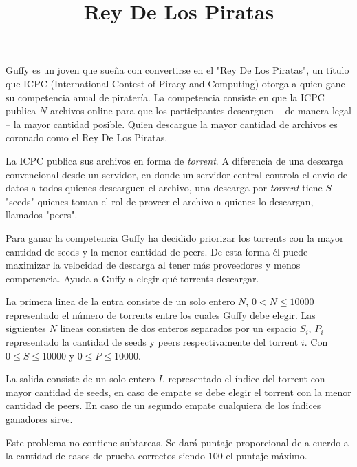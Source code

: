 \documentclass{oci}
\title{Rey De Los Piratas}
\begin{document}
\begin{problemDescription}
    Guffy es un joven que sueña con convertirse en el "Rey De Los Piratas", un título que ICPC (International
    Contest of Piracy and Computing) otorga a quien gane su competencia anual de piratería. La competencia
    consiste en que la ICPC publica $N$ archivos online para que los participantes descarguen -- de
    manera legal -- la mayor cantidad posible. Quien descargue la mayor cantidad de archivos es coronado como
    el Rey De Los Piratas.

    La ICPC publica sus archivos en forma de \emph{torrent}. A diferencia de una descarga convencional desde
    un servidor, en donde un servidor central controla el envío de datos a todos quienes descarguen el
    archivo, una descarga por \emph{torrent} tiene $S$ "seeds" quienes toman el rol de proveer el archivo
    a quienes lo descargan, llamados "peers".

    Para ganar la competencia Guffy ha decidido priorizar los torrents con la mayor cantidad de seeds y la menor
    cantidad de peers. De esta forma él puede maximizar la velocidad de descarga al tener más proveedores y menos
    competencia. Ayuda a Guffy a elegir qué torrents descargar.
\end{problemDescription}

\begin{inputDescription}
La primera linea de la entra consiste de un solo entero $N$, $0 < N \leq 10000$ representado el número de torrents
entre los cuales Guffy debe elegir. Las siguientes $N$ lineas consisten de dos enteros separados por un espacio
$S_i$, $P_i$ representado la cantidad de seeds y peers respectivamente del torrent $i$. Con $0 \leq S \leq 10000$
y $0 \leq P \leq 10000$.
\end{inputDescription}

\begin{outputDescription}
    La salida consiste de un solo entero $I$, representado el índice del torrent con mayor cantidad de seeds, en
    caso de empate se debe elegir el torrent con la menor cantidad de peers.
    En caso de un segundo empate cualquiera de los índices ganadores sirve.
\end{outputDescription}

\begin{scoreDescription}
Este problema no contiene subtareas. Se dará puntaje proporcional de a cuerdo a la cantidad de
casos de prueba correctos siendo 100 el puntaje máximo.
\end{scoreDescription}

\begin{sampleDescription}
\end{sampleDescription}
\end{document}
